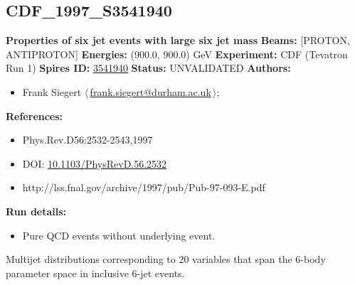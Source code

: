 \subsection[CDF\_1997\_S3541940]{CDF\_1997\_S3541940\,\cite{Abe:1997yb}}
\textbf{Properties of six jet events with large six jet mass}\newline
\textbf{Beams:} [PROTON, ANTIPROTON] \newline
\textbf{Energies:} (900.0, 900.0) GeV \newline
\textbf{Experiment:} CDF (Tevatron Run 1) \newline
\textbf{Spires ID:} \href{http://www.slac.stanford.edu/spires/find/hep/www?rawcmd=key+3541940}{3541940}\newline
\textbf{Status:} UNVALIDATED\newline
\textbf{Authors:}
\begin{itemize}
  \item Frank Siegert $\langle\,$\href{mailto:frank.siegert@durham.ac.uk}{frank.siegert@durham.ac.uk}$\,\rangle$;
\end{itemize}
\textbf{References:}
\begin{itemize}
  \item Phys.Rev.D56:2532-2543,1997
  \item DOI: \href{http://dx.doi.org/10.1103/PhysRevD.56.2532}{10.1103/PhysRevD.56.2532}
  \item http://lss.fnal.gov/archive/1997/pub/Pub-97-093-E.pdf
\end{itemize}
\textbf{Run details:}
\begin{itemize}

  \item Pure QCD events without underlying event.\end{itemize}

\noindent Multijet distributions corresponding to 20 variables that span the 6-body parameter space in inclusive 6-jet events.

\clearpage


\clearpage

